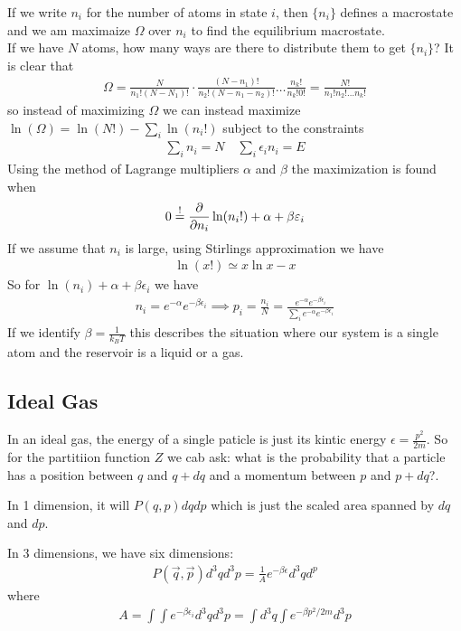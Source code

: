 If we write $n_i$ for the number of atoms in state $i$, then $\{n_i\}$ defines a macrostate and we am maximaize $\Omega$ over $n_i$ to find the equilibrium macrostate.\\

If we have $N$ atoms, how many ways are there to distribute them to get $\{n_i\}$? It is clear that
\begin{align*}
	\Omega = \frac{N}{n_1! (N-N_1)!} \cdot \frac{(N-n_1)!}{n_2!(N - n_1 - n_2)!} \dots \frac{n_k!}{n_k! 0!} = \frac{N!}{n_1!n_2! \dots n_k!}
\end{align*}
so instead of maximizing $\Omega$ we can instead maximize $\ln(\Omega) = \ln(N!)  - \sum_{i} \ln(n_i!)$ subject to the constraints 
\begin{align*}
	\sum_{i} n_i = N \quad \sum_{i}\epsilon_in_i = E
\end{align*}
Using the method of Lagrange multipliers $\alpha$ and $\beta$ the maximization is found when
\begin{align*}
	0 \stackrel{!}{=} \frac{\partial }{\partial n_i} \ln(n_i!) + \alpha + \beta \varepsilon_i	
\end{align*}
If we assume that $n_i$ is large, using Stirlings approximation we have
\begin{align*}
	\ln(x!) \simeq x \ln x - x
\end{align*}
So for $\ln(n_i) + \alpha + \beta \epsilon_i$ we have
\begin{align*}
n_i = e^{-\alpha}e^{-\beta \epsilon_i} \implies p_i = \frac{n_i}{N} = \frac{e^{-\alpha}e^{-\beta \epsilon_i}}{\sum_{i}e^{-\alpha} e^{-\beta \epsilon_i}}
\end{align*} 
If we identify $\beta = \frac{1}{k_B T}$ this describes the situation where our system is a single atom and the reservoir is a liquid or a gas.

\subsection{Ideal Gas}

In an ideal gas, the energy of a single paticle is just its kintic energy $\epsilon = \frac{p^2}{2m}$. So for the partitiion function $Z$ we cab ask: what is the probability that a particle has a position between $q$ and $q + dq$ and a momentum between $p$ and $p + dq$?.

In 1 dimension, it will $P(q,p) dq dp$ which is just the scaled area spanned by $dq$ and $dp$.

In 3 dimensions, we have six dimensions:
\begin{align*}
	P(\vec{q},\vec{p})d^3q d^3p = \frac{1}{A} e^{-\beta \epsilon}d^3q d^p
\end{align*}
where 
\begin{align*}
	A = \int \int e^{-\beta \epsilon_i}d^3q d^3p = \int d^3q \int e^{- \beta p^2/2m}d^3p
\end{align*}

